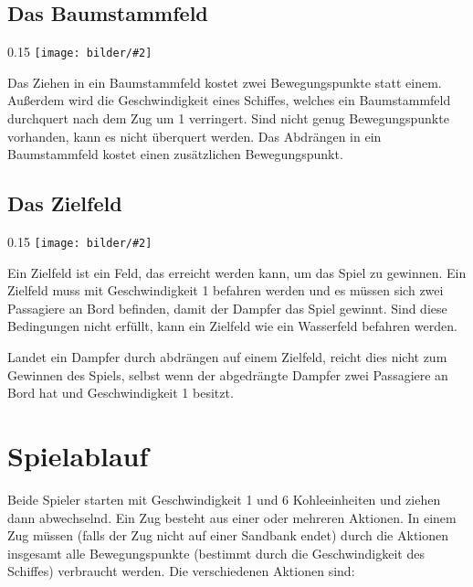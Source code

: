 \documentclass[12pt,a4paper, ngerman, oneside]{scrartcl}
\newcommand{\fieldGraphic}[2]{%
\begin{floatingfigure}[#1]{0.15\textwidth}%
  \centering
  \texttt{[image: bilder/\#2]}%
\end{floatingfigure}%
}
\begin{document}
\subsection{Das Baumstammfeld}

\fieldGraphic{r}{baumstaemme}

Das Ziehen in ein Baumstammfeld kostet zwei Bewegungspunkte statt einem.
Außerdem wird die Geschwindigkeit eines Schiffes, welches ein Baumstammfeld
durchquert nach dem Zug um 1 verringert. Sind nicht genug Bewegungspunkte
vorhanden, kann es nicht überquert werden. Das Abdrängen in ein Baumstammfeld
kostet einen zusätzlichen Bewegungspunkt.

\paragraph{}

\subsection{\label{goal}Das Zielfeld}

\fieldGraphic{r}{ziel}

Ein Zielfeld ist ein Feld, das erreicht werden kann, um das Spiel zu gewinnen.
Ein Zielfeld muss mit Geschwindigkeit 1 befahren werden und es müssen sich zwei
Passagiere an Bord befinden, damit der Dampfer das Spiel gewinnt. Sind diese
Bedingungen nicht erfüllt, kann ein Zielfeld wie ein Wasserfeld befahren werden.

Landet ein Dampfer durch abdrängen auf einem Zielfeld, reicht dies nicht zum
Gewinnen des Spiels, selbst wenn der abgedrängte Dampfer zwei Passagiere an Bord
hat und Geschwindigkeit 1 besitzt.

\paragraph{}

\section{Spielablauf}

Beide Spieler starten mit Geschwindigkeit 1 und 6 Kohleeinheiten und ziehen dann
abwechselnd. Ein Zug besteht aus einer oder mehreren Aktionen. In einem Zug
müssen (falls der Zug nicht auf einer Sandbank endet) durch die Aktionen
insgesamt alle Bewegungspunkte (bestimmt durch die Geschwindigkeit des Schiffes)
verbraucht werden. Die verschiedenen Aktionen sind:
\end{document}
